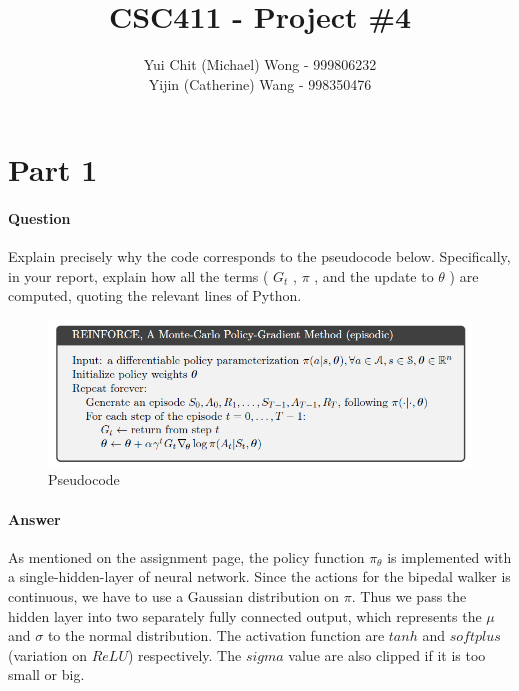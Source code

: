 \documentclass[11pt,twoside]{article}
\begin{document}
\title{CSC411 - Project \#4}
\author{Yui Chit (Michael) Wong - 999806232\\Yijin (Catherine) Wang - 998350476}
\maketitle

\clearpage

\section*{Part 1}
\paragraph{Question}
Explain precisely why the code corresponds to the pseudocode below. Specifically, in your report, explain how all the terms ( $G_t$ , $\pi$ , and the update to $\theta$ ) are computed, quoting the relevant lines of Python.

\begin{figure}[h]
	\centering
	\includegraphics[scale=0.8]{sutton&barto.png}
	\caption*{Pseudocode}
\end{figure}

\paragraph{Answer}
As mentioned on the assignment page, the policy function $\pi_{\theta}$ is implemented with a single-hidden-layer of neural network. Since the actions for the bipedal walker is continuous, we have to use a Gaussian distribution on $\pi$. Thus we pass the hidden layer into two separately fully connected output, which represents the $\mu$ and $\sigma$ to the normal distribution. The activation function are $tanh$ and $softplus$ (variation on $ReLU$) respectively. The $sigma$ value are also clipped if it is too small or big.
\end{document}
